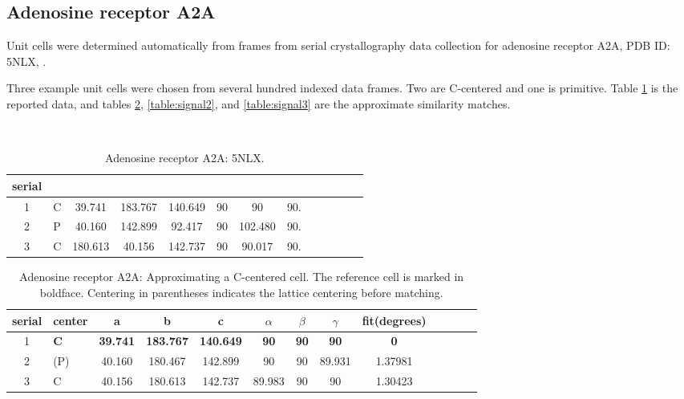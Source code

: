 \documentclass[preprint]{iucr}              %
\numberwithin{equation}{section}
\numberwithin{equation}{section}
\begin{document}
	
	\subsection{Adenosine receptor A2A}
	Unit cells were determined automatically from frames from serial crystallography data collection for adenosine receptor A2A, PDB ID: 5NLX, \cite{weinert2017}.
	
	Three example unit cells were chosen from several hundred indexed data frames.
	Two are C-centered and one is primitive. 
	Table \ref{table:signal0} is the reported data, and tables
	\ref{table:signal1}, \ref{table:signal2}, and \ref{table:signal3}
	are the approximate similarity matches.
	\begin{table}
		\begin{center}
			\caption{Adenosine receptor A2A: 5NLX.  }
~~\\
			
			\begin{tabular}{clccccccccccc}
				\toprule
				serial\\
				\midrule
				1&C&39.741&183.767&140.649&90&90&90.\\
				2&P&40.160&142.899&92.417&90&102.480&90.\\
				3&C&180.613&40.156&142.737&90&90.017&90.\\
				\bottomrule 
			\end{tabular}
			\label{table:signal0}
		\end{center}
	\end{table}

	\begin{table}
		\begin{center}
			\caption{Adenosine receptor A2A:  Approximating a C-centered cell.
				The reference cell is marked in boldface.
				 Centering in parentheses indicates the lattice centering before matching.}
			\vspace{3mm}
			\begin{tabular}{clccccccccccc}
				\toprule
serial&center &a & b & c & $\alpha$ & $\beta$ & $\gamma$ & fit(degrees) \\ \midrule         
1&\textbf{C}    & \textbf{39.741} & \textbf{183.767} & \textbf{140.649}  & \textbf{90}  &\textbf{90}  &\textbf{90} &  \textbf{0}\\
2&(P)  & 40.160 & 180.467 & 142.899  & 90  & 90  & 89.931 & 1.37981\\
3&C    & 40.156 & 180.613 & 142.737  & 89.983  & 90  & 90 &  1.30423\\
				\bottomrule
			\end{tabular}
		\end{center}
	\label{table:signal1}
	\end{table}
	
\end{document}

